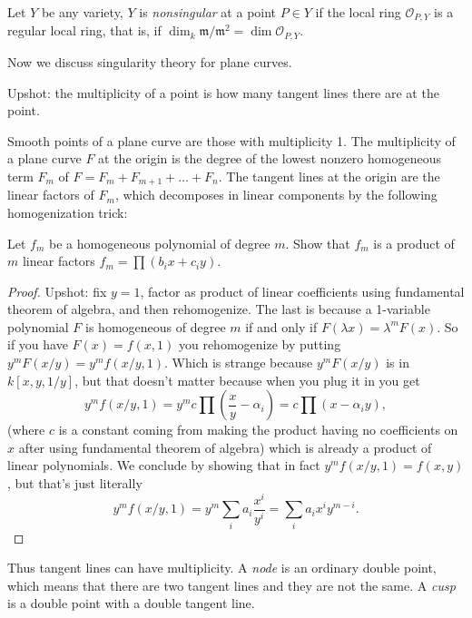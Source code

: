 \begin{definition}
\label{definition-nonsingular}
Let $Y$ be any variety,
$Y$ is {\it nonsingular} at a point $P \in Y$
if the local ring $\mathcal{O}_{P,Y}$ is a regular local ring,
that is,
if $\dim_k\mathfrak{m}/\mathfrak{m}^2=\dim \mathcal{O}_{P,Y}$.
\end{definition}

\medskip\noindent
Now we discuss singularity theory for plane curves.

Upshot: the multiplicity of a point
is how many tangent lines there are at the point.

Smooth points of a plane curve are those with multiplicity 1.
The multiplicity of a plane curve $F$ at the origin
is the degree of the lowest nonzero homogeneous term $F_m$
of $F=F_m+F_{m+1}+…+F_n$.
The tangent lines at the origin are the
linear factors of $F_m$, which decomposes in linear components
by the following homogenization trick:

\begin{exercise}
\label{exercise-factor-in-linear-terms}
Let $f_m$ be a homogeneous polynomial of degree $m$.
Show that $f_m$ is a product of $m$ linear factors
$f_m=\prod (b_ix+c_iy)$.
\end{exercise}

\begin{proof}
Upshot: fix $y=1$, factor as product of linear coefficients
using fundamental theorem of algebra, and then rehomogenize.
The last is because a 1-variable polynomial
$F$ is homogeneous of degree $m$ if and only if
$F(\lambda x)=\lambda^mF(x)$. So if you have $F(x)=f(x,1)$
you rehomogenize by putting $y^mF(x/y)=y^mf(x/y,1)$.
Which is strange because $y^mF(x/y)$ is in  $k[x,y,1/y]$,
but that doesn't matter because when you plug it in you get
 $$
y^mf(x/y,1)=y^mc\prod(\frac{x}{y}-\alpha_i)=c\prod(x-\alpha_iy),
$$
(where $c$ is a constant coming from making the product having no 
coefficients on $x$ after using fundamental theorem of algebra)
which is already a product of linear polynomials.
We conclude by showing that in fact $y^mf(x/y,1)=f(x,y)$,
but that's just literally
$$
y^mf(x/y,1)=y^m\sum_{i}a_i \frac{x^i}{y^i}
=\sum_ia_i x^iy^{m-i}.
$$
\end{proof}

\noindent
Thus tangent lines can have multiplicity.
A {\it node} is an ordinary double point,
which means that there are two tangent lines and they are not the same.
A {\it cusp} is a double point with a double tangent line.

